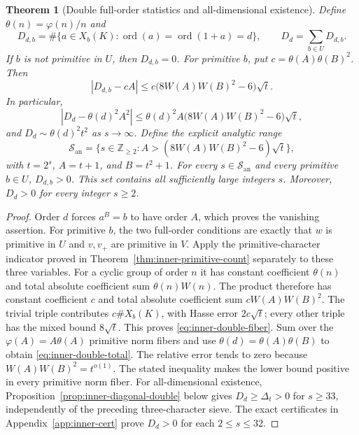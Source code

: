 \documentclass[11pt]{article}
\newtheorem{theorem}{Theorem}[section]
\begin{document}
\begin{theorem}[Double full-order statistics and all-dimensional existence]
\label{thm:inner-double-count}
Define $\theta(n)=\varphi(n)/n$ and
\[
 D_{d,b}=\#\{a\in X_b(K):\operatorname{ord}(a)
                          =\operatorname{ord}(1+a)=d\},\qquad
 D_d=\sum_{b\in U}D_{d,b}.
\]
If $b$ is not primitive in $U$, then $D_{d,b}=0$.
For primitive $b$, put $c=\theta(A)\theta(B)^2$. Then
\begin{equation}\label{eq:inner-double-fiber}
 |D_{d,b}-cA|\le c\bigl(8W(A)W(B)^2-6\bigr)\sqrt t.
\end{equation}
In particular,
\begin{equation}\label{eq:inner-double-total}
 |D_d-\theta(d)^2A^2|
 \le\theta(d)^2A\bigl(8W(A)W(B)^2-6\bigr)\sqrt t,
\end{equation}
and $D_d\sim\theta(d)^2t^2$ as $s\to\infty$.
Define the explicit analytic range
\begin{equation}\label{eq:inner-double-range}
 \mathcal S_{\mathrm{an}}
 =\{s\in\mathbb Z_{\ge2}:A>(8W(A)W(B)^2-6)\sqrt t\},
\end{equation}
with $t=2^s$, $A=t+1$, and $B=t^2+1$.
For every $s\in\mathcal S_{\mathrm{an}}$ and every primitive
$b\in U$, $D_{d,b}>0$. This set contains all sufficiently large
integers $s$. Moreover, $D_d>0$ for every integer $s\ge2$.
\end{theorem}
\begin{proof}
Order $d$ forces $a^B=b$ to have order $A$, which proves the
vanishing assertion. For primitive $b$, the two full-order conditions
are exactly that $w$ is primitive in $U$ and $v,v_+$ are primitive
in $V$. Apply the primitive-character indicator proved in
Theorem~\ref{thm:inner-primitive-count} separately to these three
variables. For a cyclic group of order $n$ it has constant coefficient
$\theta(n)$ and total absolute coefficient sum $\theta(n)W(n)$.
The product therefore has constant coefficient $c$ and total
absolute coefficient sum $cW(A)W(B)^2$.
The trivial triple contributes $c\#X_b(K)$, with Hasse error
$2c\sqrt t$; every other triple has the mixed bound
$8\sqrt t$. This proves \eqref{eq:inner-double-fiber}.
Sum over the $\varphi(A)=A\theta(A)$ primitive norm fibers and
use $\theta(d)=\theta(A)\theta(B)$ to obtain
\eqref{eq:inner-double-total}.
The relative error tends to zero because
$W(A)W(B)^2=t^{o(1)}$. The stated inequality makes the lower
bound positive in every primitive norm fiber.
For all-dimensional existence, Proposition~\ref{prop:inner-diagonal-double}
below gives $D_d\ge\Delta_t>0$ for $s\ge33$, independently of
the preceding three-character sieve. The exact certificates in
Appendix~\ref{app:inner-cert} prove $D_d>0$ for each $2\le s\le32$.
\end{proof}
\end{document}
